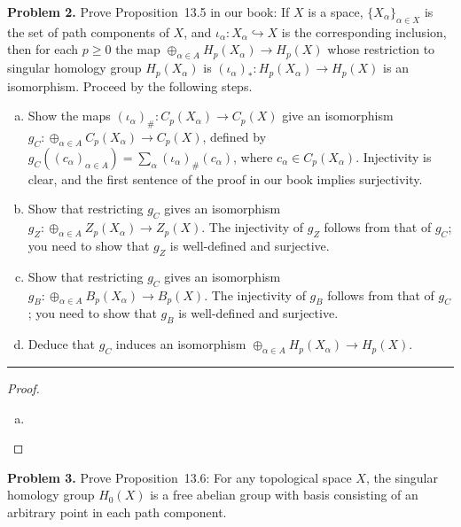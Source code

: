 \documentclass[leqno]{article}
\theoremstyle{nonumberplain}
\newtheorem{proof}{Proof}
\begin{document}
\noindent\textbf{Problem 2.} Prove Proposition~13.5 in our book: If $X$ is a space, $\{X_\alpha\}_{\alpha \in X}$ is the set of path components of $X$, and $\iota_\alpha\colon X_\alpha\hookrightarrow X$ is the corresponding inclusion, then for each $p\ge0$ the map $\oplus_{\alpha\in A}H_p(X_\alpha)\to H_p(X)$ whose restriction to singular homology group $H_p(X_\alpha)$ is $(\iota_\alpha)_*\colon H_p(X_\alpha)\to H_p(X)$ is an isomorphism. Proceed by the following steps.
\begin{enumerate}[(a)]
\item Show the maps $(\iota_\alpha)_\#\colon C_p(X_\alpha)\to C_p(X)$ give an isomorphism $g_C\colon\oplus_{\alpha\in A}C_p(X_\alpha)\to C_p(X)$, defined by $g_C((c_\alpha)_{\alpha\in A})=\sum_\alpha(\iota_\alpha)_\#(c_\alpha)$, where $c_\alpha\in C_p(X_\alpha)$. Injectivity is clear, and the first sentence of the proof in our book implies surjectivity.
\item Show that restricting $g_C$ gives an isomorphism $g_Z\colon\oplus_{\alpha\in A}Z_p(X_\alpha)\to Z_p(X)$. The injectivity of $g_Z$ follows from that of $g_C$; you need to show that $g_Z$ is well-defined and surjective.
\item Show that restricting $g_C$ gives an isomorphism $g_B\colon\oplus_{\alpha\in A}B_p(X_\alpha)\to B_p(X)$. The injectivity of $g_B$ follows from that of $g_C$; you need to show that $g_B$ is well-defined and surjective.
\item Deduce that $g_C$ induces an isomorphism $\oplus_{\alpha\in A}H_p(X_\alpha)\to H_p(X)$.
\end{enumerate}


\noindent\rule[0.5ex]{\linewidth}{1pt}

\begin{proof}
\begin{enumerate}[(a)]
\item 

\end{enumerate}
\end{proof}


\pagebreak




\noindent\textbf{Problem 3.}  Prove Proposition~13.6: For any topological space $X$, the singular homology group $H_0(X)$ is a free abelian group with basis consisting of an arbitrary point in each path component.
\end{document}
